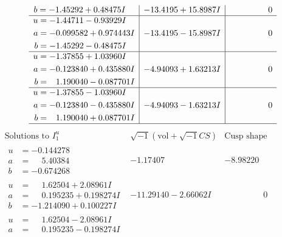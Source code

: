 \documentclass[1p]{elsarticle_modified}
\theoremstyle{definition}
\newcommand{\I}{\sqrt{-1}}
\begin{document}
$$\begin{array}{c|c|c}
\begin{aligned}
b &= -1.45292 + 0.48475 I\end{aligned}
 & -13.4195 + 15.8987 I & \phantom{-0.000000 } 0 \\ \hline\begin{aligned}
u &= -1.44711 - 0.93929 I \\
a &= -0.099582 + 0.974443 I \\
b &= -1.45292 - 0.48475 I\end{aligned}
 & -13.4195 - 15.8987 I & \phantom{-0.000000 } 0 \\ \hline\begin{aligned}
u &= -1.37855 + 1.03960 I \\
a &= -0.123840 + 0.435880 I \\
b &= \phantom{-}1.190040 - 0.087701 I\end{aligned}
 & -4.94093 + 1.63213 I & \phantom{-0.000000 } 0 \\ \hline\begin{aligned}
u &= -1.37855 - 1.03960 I \\
a &= -0.123840 - 0.435880 I \\
b &= \phantom{-}1.190040 + 0.087701 I\end{aligned}
 & -4.94093 - 1.63213 I & \phantom{-0.000000 } 0\\
 \hline 
 \end{array}$$\newpage$$\begin{array}{c|c|c}  
\text{Solutions to }I^u_{1}& \I (\text{vol} + \sqrt{-1}CS) & \text{Cusp shape}\\
 \hline 
\begin{aligned}
u &= -0.144278\phantom{ +0.000000I} \\
a &= \phantom{-}5.40384\phantom{ +0.000000I} \\
b &= -0.674268\phantom{ +0.000000I}\end{aligned}
 & -1.17407\phantom{ +0.000000I} & -8.98220\phantom{ +0.000000I} \\ \hline\begin{aligned}
u &= \phantom{-}1.62504 + 2.08961 I \\
a &= \phantom{-}0.195235 + 0.198274 I \\
b &= -1.214090 + 0.100227 I\end{aligned}
 & -11.29140 - 2.66062 I & \phantom{-0.000000 } 0 \\ \hline\begin{aligned}
u &= \phantom{-}1.62504 - 2.08961 I \\
a &= \phantom{-}0.195235 - 0.198274 I \\

\end{aligned}
\end{array}$$
\end{document}

